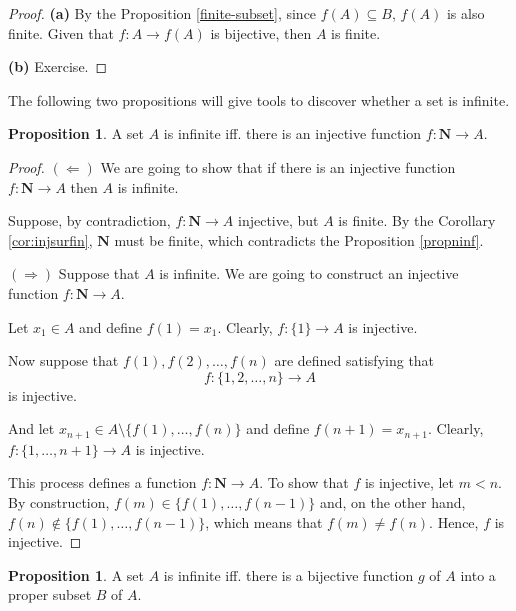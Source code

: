 \documentclass[tikz,12pt,a4paper]{article}
\theoremstyle{definition}
\newtheorem{proposition}[theorem]{Proposition}
\begin{document}
\begin{proof}
	\textbf{(a)} By the Proposition \ref{finite-subset}, since $f(A) \subseteq B$, $f(A)$ is also finite. Given that $f : A \longrightarrow f(A)$ is bijective, then $A$ is finite.

	\textbf{(b)} Exercise.
\end{proof}

The following two propositions will give tools to discover whether a set is infinite.

\begin{proposition}\label{infprop1}
	A set $A$ is infinite iff. there is an injective function $f : \textbf{N} \longrightarrow A$.
\end{proposition}

\begin{proof}
	$(\Leftarrow)$ We are going to show that if there is an injective function $f : \textbf{N} \longrightarrow A$ then $A$ is infinite.
	
	Suppose, by contradiction, $f : \textbf{N} \longrightarrow A$ injective, but $A$ is finite. By the Corollary \ref{cor:injsurfin}, $\textbf{N}$ must be finite, which contradicts the Proposition \ref{propninf}.
	
	$(\Rightarrow)$ Suppose that $A$ is infinite. We are going to construct an injective function $f : \textbf{N} \longrightarrow A$.
	
	Let $x_1 \in A$ and define $f(1) = x_1$. Clearly, $f : \{1\} \longrightarrow A$ is injective.
	
	Now suppose that $f(1), f(2), \ldots, f(n)$ are defined satisfying that \[f : \{ 1, 2, \ldots, n \} \longrightarrow A\] is injective.
	
	And let $x_{n+1} \in A \setminus \{f(1), \ldots, f(n) \}$ and define $f(n+1) = x_{n+1}$. Clearly, $f : \{ 1, \ldots, n+1 \} \longrightarrow A$ is injective.
	
	This process defines a function $f : \textbf{N} \longrightarrow A$. To show that $f$ is injective, let $m < n$. By construction, $f(m) \in \{ f(1), \ldots, f(n-1) \}$ and, on the other hand, $f(n) \notin \{ f(1), \ldots, f(n-1) \}$, which means that $f(m) \neq f(n)$. Hence, $f$ is injective.
\end{proof}

\begin{proposition}\label{infprop2}
	A set $A$ is infinite iff. there is a bijective function $g$ of $A$ into a proper subset $B$ of $A$.
\end{proposition}
\end{document}
